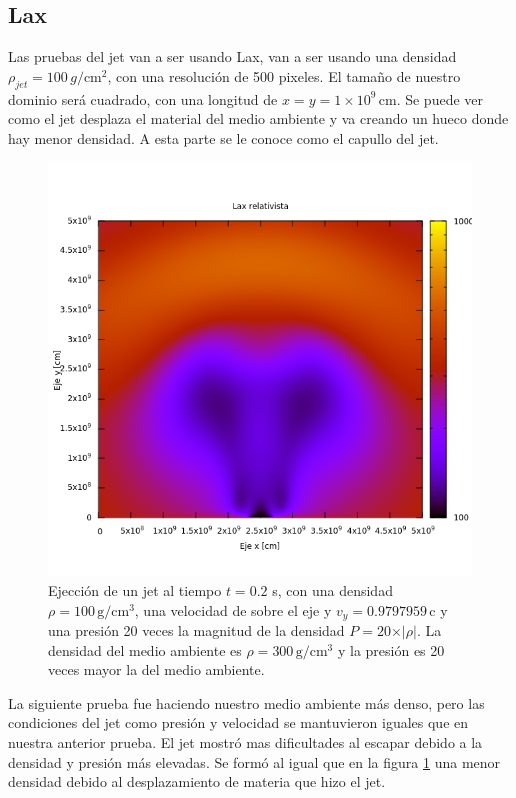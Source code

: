 \documentclass[12pt,a4paper]{book}
\begin{document}
\subsection{Lax}

Las pruebas del jet van a ser usando Lax, van a ser usando una densidad $\rho_{jet}  = 100 \, g/\mathrm{cm}^2$, con una resolución de 500 pixeles. El tamaño de nuestro dominio será cuadrado, con una longitud de $x = y = 1\times 10^9 \, \mathrm{cm}$. Se puede ver como el jet desplaza el material del medio ambiente y va creando un hueco donde hay menor densidad. A esta parte se le conoce como el capullo del jet.

\begin{figure}[H] \label{fig:jet_ma_300}%
\centering
\includegraphics[scale=0.5]{./Figuras/Pruebas/Prueba_jet/lax/jet_100_t_20} 
\caption{Ejección de un jet al tiempo $t = 0.2$ s, con una densidad  $\rho = 100 \, \mathrm{g}/\mathrm{cm}^3$, una velocidad de sobre el eje y $v_y = 0.9797959 \, \mathrm{c}$  y una presión 20 veces la  magnitud de la densidad $P = 20 \times \vert \rho \vert$. La densidad del medio ambiente es $\rho = 300 \, \mathrm{g}/\mathrm{cm}^3$ y la presión es 20 veces mayor la del medio ambiente.}
\end{figure}

La siguiente prueba fue haciendo nuestro medio ambiente más denso, pero las condiciones del jet como presión y velocidad se mantuvieron iguales que en nuestra anterior prueba. El jet mostró mas dificultades al escapar debido a la densidad y presión más elevadas. Se formó al igual que en la figura \ref{fig:jet_ma_300} una menor densidad debido al desplazamiento de materia que hizo el jet.
\end{document}
